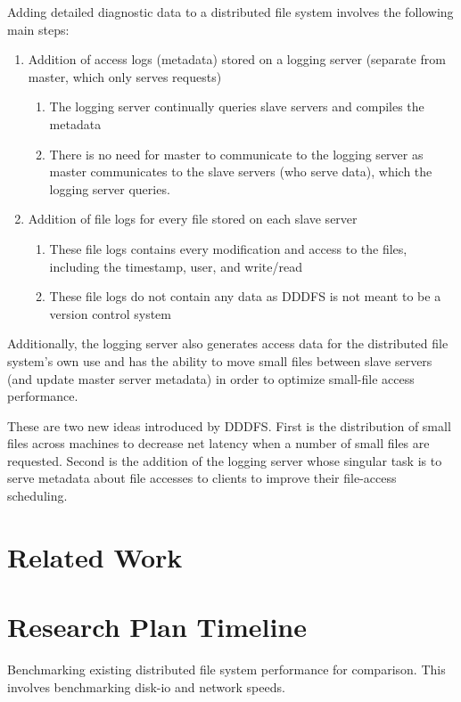 \documentclass{article}
\begin{document}
Adding detailed diagnostic data to a distributed file system involves the following main steps:

\begin{enumerate}
\item Addition of access logs (metadata) stored on a logging server (separate from master, which only serves requests)
	\begin{enumerate}
	\item The logging server continually queries slave servers and compiles the metadata
	\item There is no need for master to communicate to the logging server as master communicates to the slave servers (who serve data), which the logging server queries. 
	\end{enumerate}
\item Addition of file logs for every file stored on each slave server
	\begin{enumerate}
	\item These file logs contains every modification and access to the files, including the timestamp, user, and write/read
	\item These file logs do not contain any data as DDDFS is not meant to be a version control system
	\end{enumerate}
\end{enumerate}

Additionally, the logging server also generates access data for the distributed file system's own use and has the ability to move small files between slave servers (and update master server metadata) in order to optimize small-file access performance. 

These are two new ideas introduced by DDDFS. First is the distribution of small files across machines to decrease net latency when a number of small files are requested. Second is the addition of the logging server whose singular task is to serve metadata about file accesses to clients to improve their file-access scheduling. 

\section{Related Work}

\section{Research Plan Timeline}

Benchmarking existing distributed file system performance for comparison. This involves benchmarking disk-io and network speeds. 
\end{document}
